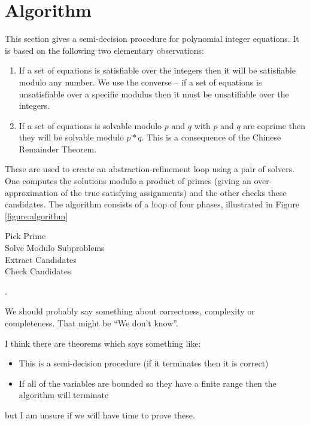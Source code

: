 \section{Algorithm}
\label{section:algorithm}


This section gives a semi-decision procedure for polynomial integer
equations.
%
It is based on the following two elementary observations:
%
\begin{enumerate}
\item{If a set of equations is satisfiable over the integers then it
  will be satisfiable modulo any number.  We use the converse -- if a
  set of equations is unsatisfiable over a specific modulus then it
  must be unsatifiable over the integers.}
\item{If a set of equations is solvable modulo $p$ and $q$ with $p$ and
  $q$ are coprime then they will be solvable modulo $p*q$.  This is a
  consequence of the Chinese Remainder Theorem.}
\end{enumerate}
%
These are used to create an abstraction-refinement loop using a pair
of solvers.  One computes the solutions modulo a product of primes
(giving an over-approximation of the true satisfying assignments) and
the other checks these candidates.
%
The algorithm consists of a loop of four phases, illustrated in Figure
\ref{figure:algorithm}

\begin{description}
  \item[Pick Prime]{}
  \item[Solve Modulo Subproblems]{}
  \item[Extract Candidates]{}
  \item[Check Candidates]{}
\end{description}

\begin{figure*}
  \caption{A semi-decision procedure for polynomial integer equations.}
  \label{figure:algorithm}.
\end{figure*}





We should probably say something about correctness, complexity or completeness.
That might be ``We don't know''. 

I think there are theorems which says something like:
\begin{itemize}
\item{This is a semi-decision procedure (if it terminates then it is correct)}
\item{If all of the variables are bounded so they have a finite range
  then the algorithm will terminate}
\end{itemize}
but I am unsure if we will have time to prove these.

